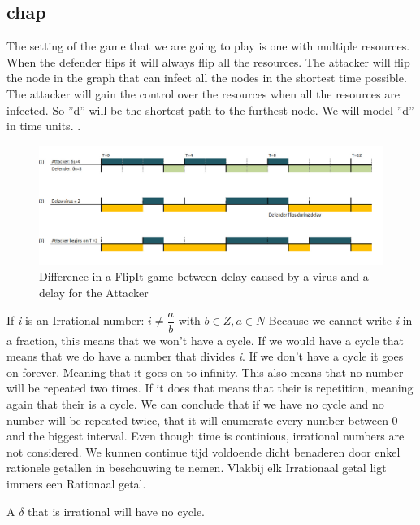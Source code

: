 \subsection{chap}
The setting of the game that we are going to play is one with multiple resources. When the defender flips it will always flip all the resources. The attacker will flip the node in the graph that can infect all the nodes in the shortest time possible. The attacker will gain the control over the resources when all the resources are infected. So ''d'' will be the shortest path to the furthest node. We will model ''d'' in time units. .
\begin{figure}[hbtp]
\caption{Difference in a FlipIt game between delay caused by a virus and a delay for the Attacker}
\centering
\includegraphics[scale=0.3]{Images/diffVirusDelay.jpg}
\end{figure}

If \textit{i} is an Irrational number:
$ i \neq \dfrac{a}{b}$ with $b \in Z, a \in N$
Because we cannot write \textit{i} in a fraction, this means that we won't have a cycle. If we would have a cycle that means that we do have a number that divides \textit{i}. If we don't have a cycle it goes on forever. Meaning that it goes on to infinity. This also means that no number will be repeated two times. If it does that means that their is repetition, meaning again that their is a cycle. We can conclude that if we have no cycle and no number will be repeated twice, that it will enumerate every number between 0 and the biggest interval. 
Even though time is continious, irrational numbers are not considered. We kunnen continue tijd voldoende dicht benaderen door enkel rationele getallen in beschouwing te nemen. Vlakbij elk Irrationaal getal ligt immers een Rationaal getal.

A $\delta$ that is irrational will have no cycle. 







